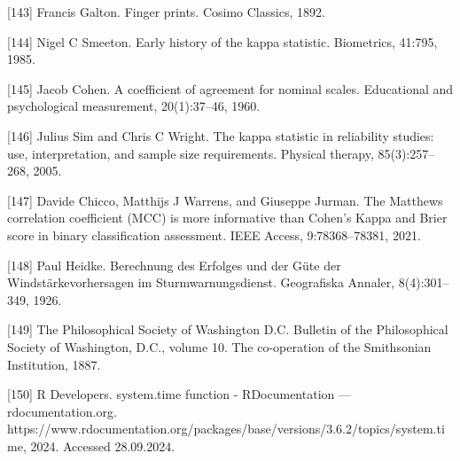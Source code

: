 \documentclass[preprint,12pt]{elsarticle}
\begin{document}
[143] Francis Galton. Finger prints. Cosimo Classics, 1892. 

[144] Nigel C Smeeton. Early history of the kappa statistic. Biometrics, 41:795, 1985. 

[145] Jacob Cohen. A coefficient of agreement for nominal scales. Educational and psychological measurement, 20(1):37–46, 1960. 

[146] Julius Sim and Chris C Wright. The kappa statistic in reliability studies: use, interpretation, and sample size requirements. Physical therapy, 85(3):257–268, 2005. 

[147] Davide Chicco, Matthijs J Warrens, and Giuseppe Jurman. The Matthews correlation coefficient (MCC) is more informative than Cohen’s Kappa and Brier score in binary classification assessment. IEEE Access, 9:78368–78381, 2021. 

[148] Paul Heidke. Berechnung des Erfolges und der Güte der Windstärkevorhersagen im Sturmwarnungsdienst. Geografiska Annaler, 8(4):301–349, 1926. 

[149] The Philosophical Society of Washington D.C. Bulletin of the Philosophical Society of Washington, D.C., volume 10. The co-operation of the Smithsonian Institution, 1887. 

[150] R Developers. system.time function - RDocumentation — rdocumentation.org. https://www.rdocumentation.org/packages/base/versions/3.6.2/topics/system.time, 2024. Accessed 28.09.2024.
\end{document}
